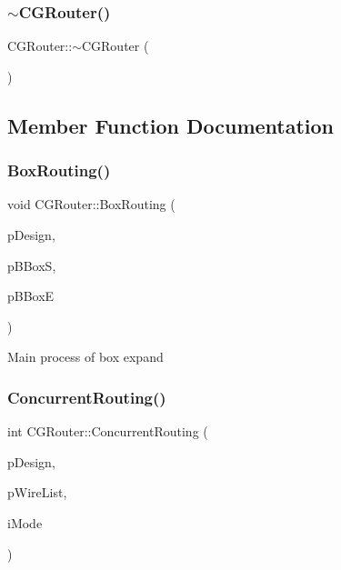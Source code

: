 \mbox{\label{classCGRouter_ab96e5ed8e11e1834c47fec6961f01c23}} 
\subsubsection{\texorpdfstring{$\sim$CGRouter()}{~CGRouter()}}
{\footnotesize\ttfamily C\+G\+Router\+::$\sim$\+C\+G\+Router (\begin{DoxyParamCaption}{ }\end{DoxyParamCaption})\hspace{0.3cm}{\ttfamily [virtual]}}



\subsection{Member Function Documentation}
\mbox{\label{classCGRouter_a65501a12c10da7894dc0e96ce5c449c0}} 
\subsubsection{\texorpdfstring{BoxRouting()}{BoxRouting()}}
{\footnotesize\ttfamily void C\+G\+Router\+::\+Box\+Routing (\begin{DoxyParamCaption}\item[{\mbox{\hyperlink{classCDesign}{C\+Design}} $\ast$}]{p\+Design,  }\item[{\mbox{\hyperlink{classCBBox}{C\+B\+Box}} $\ast$}]{p\+B\+BoxS,  }\item[{\mbox{\hyperlink{classCBBox}{C\+B\+Box}} $\ast$}]{p\+B\+BoxE }\end{DoxyParamCaption})\hspace{0.3cm}{\ttfamily [static]}}

Main process of box expand \mbox{\label{classCGRouter_a5c1d10e81773579ad3acbdaf5965725e}} 
\subsubsection{\texorpdfstring{ConcurrentRouting()}{ConcurrentRouting()}}
{\footnotesize\ttfamily int C\+G\+Router\+::\+Concurrent\+Routing (\begin{DoxyParamCaption}\item[{\mbox{\hyperlink{classCDesign}{C\+Design}} $\ast$}]{p\+Design,  }\item[{vector$<$ \mbox{\hyperlink{classCWire}{C\+Wire}} $\ast$ $>$ $\ast$}]{p\+Wire\+List,  }\item[{int}]{i\+Mode }\end{DoxyParamCaption})\hspace{0.3cm}{\ttfamily [static]}}

